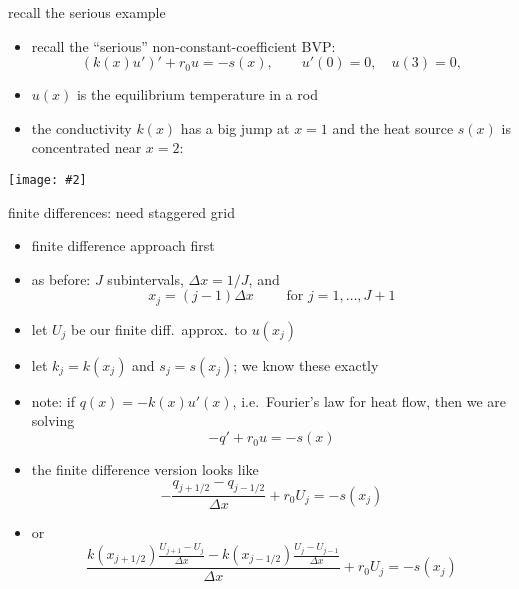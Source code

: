 \documentclass[10pt,hyperref]{beamer}
\newcommand{\centerimage}[2]{\begin{center}
\texttt{[image: \#2]}
\end{center}}
\begin{document}
\begin{frame}{recall the serious example}

\begin{itemize}
\item recall the ``serious'' non-constant-coefficient BVP:
\begin{equation}\label{seriousagain}
\left(k(x) u'\right)' + r_0 u = - s(x), \qquad u'(0)=0, \quad u(3) = 0,
\end{equation}
\item $u(x)$ is the equilibrium temperature in a rod
\item the conductivity $k(x)$ has a big jump at $x=1$ and the heat source $s(x)$ is concentrated near $x=2$:
\end{itemize}

\centerimage{0.6}{nonconstant-crop90}

\end{frame}


\begin{frame}{finite differences: need staggered grid} 

\begin{itemize}
\item finite difference approach first
\item as before: $J$ subintervals, $\Delta x = 1/J$, and
	$$x_j = (j-1) \Delta x \qquad \text{ for } j=1,\dots,J+1$$
\item let $U_j$ be our finite diff.~approx.~to $u(x_j)$
\item let $k_j = k(x_j)$ and $s_j = s(x_j)$; we know these exactly
\item note: if $q(x) = -k(x) u'(x)$, i.e.~Fourier's law for heat flow, then we are solving 
	$$- q' + r_0 u = -s(x)$$
\item the finite difference version looks like
	$$- \frac{q_{j+1/2} - q_{j-1/2}}{\Delta x} + r_0 U_j = - s(x_j)$$
\item or
	$$\frac{k(x_{j+1/2}) \frac{U_{j+1} - U_j}{\Delta x} - k(x_{j-1/2}) \frac{U_{j} - U_{j-1}}{\Delta x}}{\Delta x} + r_0 U_j = - s(x_j)$$
\end{itemize}
\end{frame}


\newcommand{\shalf}{\frac{1}{2}}
\end{document}
